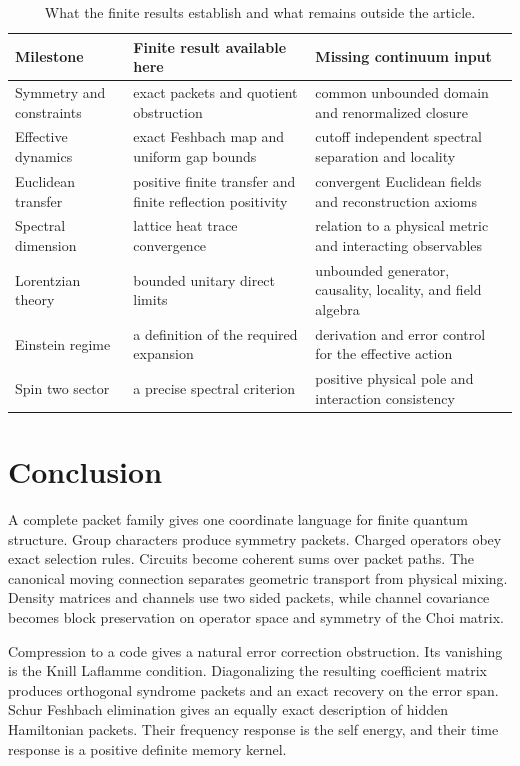 \begin{table}[t]
\centering
\small
\begin{tabular}{>{\raggedright\arraybackslash}p{}>{\raggedright\arraybackslash}p{}>{\raggedright\arraybackslash}p{}}
\toprule
Milestone & Finite result available here & Missing continuum input \\
\midrule
Symmetry and constraints & exact packets and quotient obstruction & common unbounded domain and renormalized closure \\
Effective dynamics & exact Feshbach map and uniform gap bounds & cutoff independent spectral separation and locality \\
Euclidean transfer & positive finite transfer and finite reflection positivity & convergent Euclidean fields and reconstruction axioms \\
Spectral dimension & lattice heat trace convergence & relation to a physical metric and interacting observables \\
Lorentzian theory & bounded unitary direct limits & unbounded generator, causality, locality, and field algebra \\
Einstein regime & a definition of the required expansion & derivation and error control for the effective action \\
Spin two sector & a precise spectral criterion & positive physical pole and interaction consistency \\
\bottomrule
\end{tabular}
\caption{What the finite results establish and what remains outside the article.}
\label{strong:tab:continuum_milestones}
\end{table}

\section{Conclusion}\label{strong:section:015}\label{strong:sec:conclusion}

A complete packet family gives one coordinate language for finite quantum structure. Group characters produce symmetry packets. Charged operators obey exact selection rules. Circuits become coherent sums over packet paths. The canonical moving connection separates geometric transport from physical mixing. Density matrices and channels use two sided packets, while channel covariance becomes block preservation on operator space and symmetry of the Choi matrix.

Compression to a code gives a natural error correction obstruction. Its vanishing is the Knill Laflamme condition. Diagonalizing the resulting coefficient matrix produces orthogonal syndrome packets and an exact recovery on the error span. Schur Feshbach elimination gives an equally exact description of hidden Hamiltonian packets. Their frequency response is the self energy, and their time response is a positive definite memory kernel.

